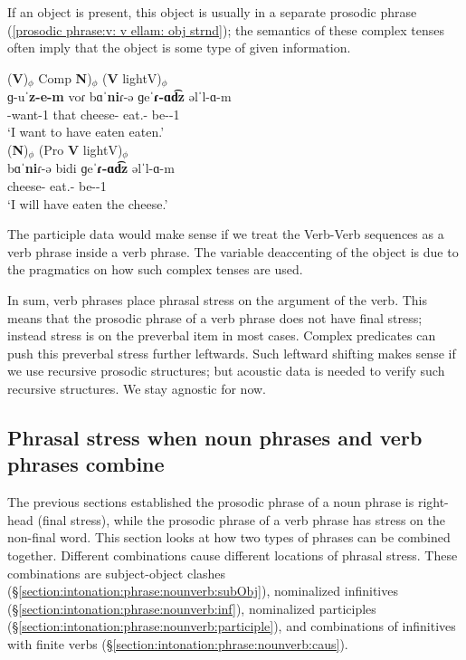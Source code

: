 If an object is present, this object is usually   in a separate prosodic phrase (\ref{prosodic phrase:v: v ellam: obj strnd}); the semantics of these complex tenses often imply that the object is some type of given information. 


\begin{exe}
	\ex \label{prosodic phrase:v: v ellam: obj strnd} \begin{xlist}
		\ex \glll  (\textbf{V})$_\phi$ Comp  \textbf{N})$_\phi$ (\textbf{V} lightV)$_\phi$ \\ 
		ɡ-uˈ\textbf{z-e-m} voɾ bɑˈ\textbf{ni}ɾ-ə ɡeˈ\textbf{ɾ-ɑd͡z} əlˈl-ɑ-m \\
		{\ind}-want{\thgloss}-1{\sg} that cheese-{} eat.{\aorperf}-{\rptcp} be-{\thgloss}-1{\sg} \\
		\trans `I want to have eaten eaten.'  \label{prosodic phrase:v: v ellam: obj} 
		\\ 
		\ex \glll  (\textbf{N})$_\phi$ (Pro \textbf{V} lightV)$_\phi$ \\ 
		bɑˈ\textbf{ni}ɾ-ə  bidi ɡeˈ\textbf{ɾ-ɑd͡z} əlˈl-ɑ-m \\
		cheese-{} {\fut}   eat.{\aorperf}-{\rptcp} be-{\thgloss}-1{\sg} \\
		\trans `I will have eaten the cheese.'  \label{prosodic phrase:v: bidi v ellam: obj} 
		\\ 
	\end{xlist}
\end{exe}

The participle  data would make sense if we treat the Verb-Verb sequences as a verb phrase inside a verb phrase. The variable deaccenting of the object is due to the pragmatics on how such complex tenses are used. 

In sum, verb phrases place phrasal stress on the argument of the verb. This means that the prosodic phrase of a verb phrase does not have final stress; instead stress is on the preverbal item in most cases. Complex predicates can push this preverbal stress further leftwards. Such leftward shifting makes sense if we use recursive prosodic structures; but acoustic data is needed to verify such recursive structures. We stay agnostic for now. 


\subsection{Phrasal stress when noun phrases and verb phrases combine}\label{section:intonation:phrase:nounverb}
The previous sections established the prosodic phrase of a noun phrase is right-head (final stress), while the prosodic phrase of a verb phrase has stress on the non-final word. This section looks at how two types of phrases can be combined together. Different combinations cause different locations of phrasal stress. These combinations are subject-object clashes (\S\ref{section:intonation:phrase:nounverb:subObj}), nominalized infinitives (\S\ref{section:intonation:phrase:nounverb:inf}), nominalized participles (\S\ref{section:intonation:phrase:nounverb:participle}), and combinations of infinitives with finite verbs (\S\ref{section:intonation:phrase:nounverb:caus}).   

